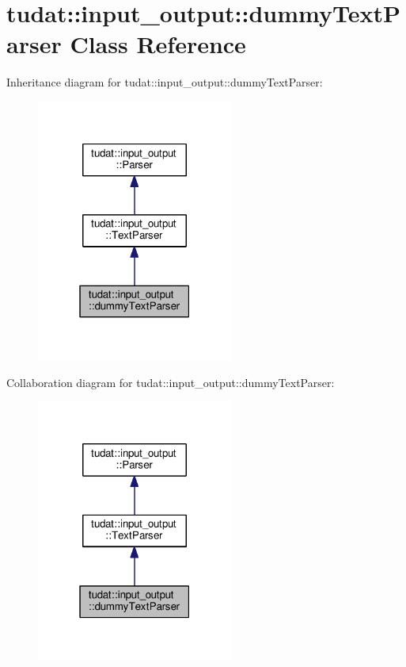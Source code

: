 \hypertarget{classtudat_1_1input__output_1_1dummyTextParser}{}\section{tudat\+:\+:input\+\_\+output\+:\+:dummy\+Text\+Parser Class Reference}
\label{classtudat_1_1input__output_1_1dummyTextParser}


Inheritance diagram for tudat\+:\+:input\+\_\+output\+:\+:dummy\+Text\+Parser\+:
\nopagebreak
\begin{figure}[H]
\begin{center}
\leavevmode
\includegraphics[width=183pt]{classtudat_1_1input__output_1_1dummyTextParser__inherit__graph}
\end{center}
\end{figure}


Collaboration diagram for tudat\+:\+:input\+\_\+output\+:\+:dummy\+Text\+Parser\+:
\nopagebreak
\begin{figure}[H]
\begin{center}
\leavevmode
\includegraphics[width=183pt]{classtudat_1_1input__output_1_1dummyTextParser__coll__graph}
\end{center}
\end{figure}
